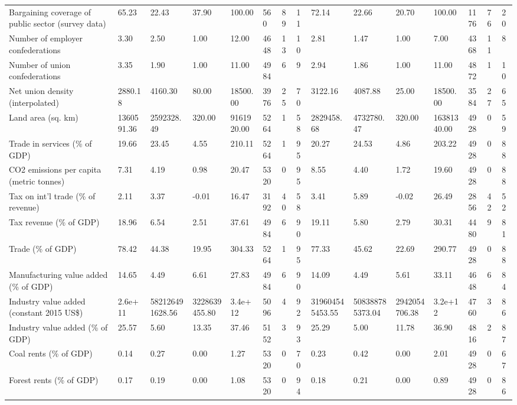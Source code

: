 \begin{longtable}{lllllllllllllll}
\addlinespace
Bargaining coverage of public sector (survey data) & 65.23 & 22.43 & 37.90 & 100.00 & 560 & 89 & 11 & 72.14 & 22.66 & 20.70 & 100.00 & 1176 & 76 & 20\\
Number of employer confederations & 3.30 & 2.50 & 1.00 & 12.00 & 4648 & 13 & 10 & 2.81 & 1.47 & 1.00 & 7.00 & 4368 & 11 & 8\\
Number of union confederations & 3.35 & 1.90 & 1.00 & 11.00 & 4984 & 6 & 9 & 2.94 & 1.86 & 1.00 & 11.00 & 4872 & 1 & 10\\
Net union density (interpolated) & 2880.18 & 4160.30 & 80.00 & 18500.00 & 3976 & 25 & 70 & 3122.16 & 4087.88 & 25.00 & 18500.00 & 3584 & 27 & 65\\
Land area (sq. km) & 1360591.36 & 2592328.49 & 320.00 & 9161920.00 & 5264 & 1 & 58 & 2829458.68 & 4732780.47 & 320.00 & 16381340.00 & 4928 & 0 & 59\\
\addlinespace
Trade in services (\% of GDP) & 19.66 & 23.45 & 4.55 & 210.11 & 5264 & 1 & 95 & 20.27 & 24.53 & 4.86 & 203.22 & 4928 & 0 & 88\\
CO2 emissions per capita (metric tonnes) & 7.31 & 4.19 & 0.98 & 20.47 & 5320 & 0 & 95 & 8.55 & 4.40 & 1.72 & 19.60 & 4928 & 0 & 88\\
Tax on int'l trade (\% of revenue) & 2.11 & 3.37 & -0.01 & 16.47 & 3192 & 40 & 58 & 3.41 & 5.89 & -0.02 & 26.49 & 2856 & 42 & 52\\
Tax revenue (\% of GDP) & 18.96 & 6.54 & 2.51 & 37.61 & 4984 & 6 & 90 & 19.11 & 5.80 & 2.79 & 30.31 & 4480 & 9 & 81\\
Trade (\% of GDP) & 78.42 & 44.38 & 19.95 & 304.33 & 5264 & 1 & 95 & 77.33 & 45.62 & 22.69 & 290.77 & 4928 & 0 & 88\\
\addlinespace
Manufacturing value added (\% of GDP) & 14.65 & 4.49 & 6.61 & 27.83 & 4984 & 6 & 90 & 14.09 & 4.49 & 5.61 & 33.11 & 4648 & 6 & 84\\
Industry value added (constant 2015 US\$) & 2.6e+11 & 582126491628.56 & 3228639455.80 & 3.4e+12 & 5096 & 4 & 92 & 319604545453.55 & 508388785373.04 & 2942054706.38 & 3.2e+12 & 4760 & 3 & 86\\
Industry value added (\% of GDP) & 25.57 & 5.60 & 13.35 & 37.46 & 5152 & 3 & 93 & 25.29 & 5.00 & 11.78 & 36.90 & 4816 & 2 & 87\\
Coal rents (\% of GDP) & 0.14 & 0.27 & 0.00 & 1.27 & 5320 & 0 & 70 & 0.23 & 0.42 & 0.00 & 2.01 & 4928 & 0 & 67\\
Forest rents (\% of GDP) & 0.17 & 0.19 & 0.00 & 1.08 & 5320 & 0 & 94 & 0.18 & 0.21 & 0.00 & 0.89 & 4928 & 0 & 86\\

\end{longtable}
